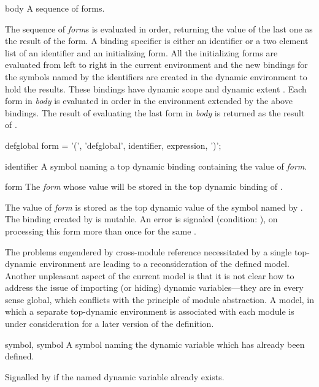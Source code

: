 \begin{optDefinition}
\begin{arguments}
    \item[body] A sequence of forms.
\end{arguments}
%
\result%
The sequence of {\em form}s is evaluated in order, returning the value of the
last one as the result of the  form.
%
\remarks%
A binding specifier is either an identifier or a two element list of an
identifier and an initializing form.  All the initializing forms are evaluated
from left to right in the current environment and the new bindings for the
symbols named by the identifiers are created in the dynamic environment to hold
the results.  These bindings have dynamic scope and dynamic extent
.  Each
form in {\em body} is evaluated in order in the environment extended by the
above bindings.  The result of evaluating the last form in {\em body} is
returned as the result of .

%
\Syntax
\savesyntax{}\vbox{\syntax
defglobal form
   = '(', 'defglobal', identifier, expression, ')';
\endsyntax}
%
\begin{arguments}
    \item[identifier] A symbol naming a top dynamic binding containing the value
    of {\em form}.

    \item[form] The {\em form} whose value will be stored in the top dynamic
    binding of .
\end{arguments}
%
\remarks%
The value of {\em form} is stored as the top dynamic value of the symbol named
by  .  The binding created by
 is mutable.  An error is signaled (condition:
), on processing this form more than
once for the same .
%
\begin{note}
    The problems engendered by cross-module reference necessitated by a single
    top-dynamic environment are leading to a reconsideration of the defined
    model.  Another unpleasant aspect of the current model is that it is not
    clear how to address the issue of importing (or hiding) dynamic
    variables---they are in every sense global, which conflicts with the
    principle of module abstraction.  A model, in which a separate top-dynamic
    environment is associated with each module is under consideration for a
    later version of the definition.
\end{note}

%
\begin{initoptions}
    \item[symbol, symbol] A symbol naming the dynamic variable which has already
    been defined.
\end{initoptions}
%
\remarks%
Signalled by  if the named dynamic variable already
exists.
\end{optDefinition}

